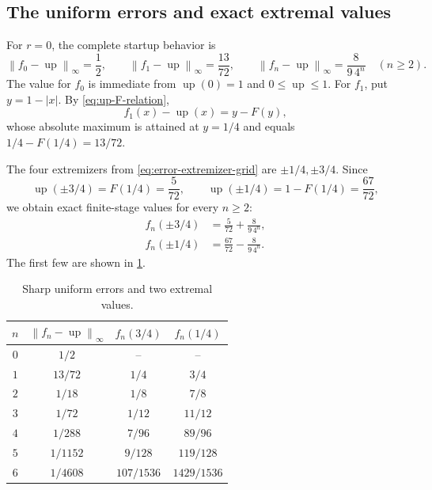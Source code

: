 \documentclass[11pt,oneside]{article}
\theoremstyle{definition}
\theoremstyle{remark}
\newcommand{\Up}{\operatorname{up}}
\newcommand{\norm}[1]{\left\lVert#1\right\rVert}
\begin{document}
\subsection{The uniform errors and exact extremal values}

For $r=0$, the complete startup behavior is
\begin{equation}
 \norm{f_0-\Up}_\infty=\frac12,
 \qquad
 \norm{f_1-\Up}_\infty=\frac{13}{72},
 \qquad
 \norm{f_n-\Up}_\infty=\frac{8}{9\,4^n}\quad(n\ge2).
 \label{eq:all-uniform-errors}
\end{equation}
The value for $f_0$ is immediate from $\Up(0)=1$ and $0\le\Up\le1$.  For $f_1$, put
$y=1-|x|$.  By \eqref{eq:up-F-relation},
\begin{equation}
 f_1(x)-\Up(x)=y-F(y),
 \label{eq:f1-error-F}
\end{equation}
whose absolute maximum is attained at $y=1/4$ and equals
$1/4-F(1/4)=13/72$.

The four extremizers from \eqref{eq:error-extremizer-grid} are
$\pm1/4,\pm3/4$.  Since
\begin{equation}
 \Up(\pm3/4)=F(1/4)=\frac5{72},
 \qquad
 \Up(\pm1/4)=1-F(1/4)=\frac{67}{72},
 \label{eq:up-quarter-values}
\end{equation}
we obtain exact finite-stage values for every $n\ge2$:
\begin{align}
 f_n(\pm3/4)&=\frac5{72}+\frac{8}{9\,4^n},
 \label{eq:fn-threequarter}\\
 f_n(\pm1/4)&=\frac{67}{72}-\frac{8}{9\,4^n}.
 \label{eq:fn-onequarter}
\end{align}
The first few are shown in \cref{tab:exact-errors}.

\begin{table}[htbp]
\centering
\caption{Sharp uniform errors and two extremal values.}
\label{tab:exact-errors}
\begin{tabular}{c@{\qquad}c@{\qquad}c@{\qquad}c}
\toprule
$n$&$\norm{f_n-\Up}_\infty$&$f_n(3/4)$&$f_n(1/4)$\\
\midrule
$0$&$1/2$&--&--\\
$1$&$13/72$&$1/4$&$3/4$\\
$2$&$1/18$&$1/8$&$7/8$\\
$3$&$1/72$&$1/12$&$11/12$\\
$4$&$1/288$&$7/96$&$89/96$\\
$5$&$1/1152$&$9/128$&$119/128$\\
$6$&$1/4608$&$107/1536$&$1429/1536$\\
\bottomrule
\end{tabular}
\end{table}
\end{document}
